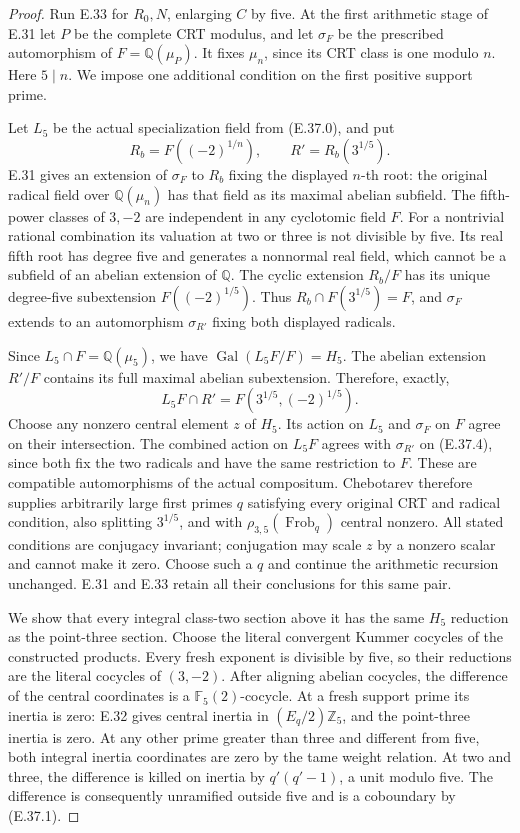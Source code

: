 \begin{proof}
Run E.33 for $R_0,N$, enlarging $C$ by five.  At the first arithmetic
stage of E.31 let $P$ be the complete CRT modulus, and let
$\sigma_F$ be the prescribed automorphism of
$F=\mathbb Q(\mu_P)$.  It fixes $\mu_n$, since its CRT class is
one modulo $n$.  Here $5\mid n$.  We impose one additional
condition on the first positive support prime.

Let $L_5$ be the actual specialization field from (E.37.0), and put
\[
 R_b=F((-2)^{1/n}),\qquad R'=R_b(3^{1/5}).
 \tag{E.37.3}
\]
E.31 gives an extension of $\sigma_F$ to $R_b$ fixing the displayed
$n$-th root: the original radical field over $\mathbb Q(\mu_n)$
has that field as its maximal abelian subfield.  The fifth-power
classes of $3,-2$ are independent in any cyclotomic field $F$.
For a nontrivial rational combination its valuation at two or
three is not divisible by five.  Its real fifth root has degree
five and generates a nonnormal real field, which cannot be a
subfield of an abelian extension of $\mathbb Q$.
The cyclic extension $R_b/F$ has its unique degree-five
subextension $F((-2)^{1/5})$.  Thus
$R_b\cap F(3^{1/5})=F$, and $\sigma_F$ extends to an
automorphism $\sigma_{R'}$ fixing both displayed radicals.

Since $L_5\cap F=\mathbb Q(\mu_5)$, we have
$\operatorname{Gal}(L_5F/F)=H_5$.  The abelian extension
$R'/F$ contains its full maximal abelian subextension.
Therefore, exactly,
\[
                 L_5F\cap R'=F(3^{1/5},(-2)^{1/5}).
 \tag{E.37.4}
\]
Choose any nonzero central element $z$ of $H_5$.  Its action on
$L_5$ and $\sigma_F$ on $F$ agree on their intersection.
The combined action on $L_5F$ agrees with $\sigma_{R'}$ on
(E.37.4), since both fix the two radicals and have the same
restriction to $F$.  These are compatible automorphisms of the
actual compositum.  Chebotarev therefore supplies arbitrarily
large first primes $q$ satisfying every original CRT and radical
condition, also splitting $3^{1/5}$, and with
$\rho_{3,5}(\operatorname{Frob}_q)$ central nonzero.
All stated conditions are conjugacy invariant; conjugation may
scale $z$ by a nonzero scalar and cannot make it zero.
Choose such a $q$ and continue the arithmetic recursion unchanged.
E.31 and E.33 retain all their conclusions for this same pair.

We show that every integral class-two section above it has the
same $H_5$ reduction as the point-three section.  Choose the
literal convergent Kummer cocycles of the constructed products.
Every fresh exponent is divisible by five, so their reductions
are the literal cocycles of $(3,-2)$.  After aligning abelian
cocycles, the difference of the central coordinates is a
$\mathbb F_5(2)$-cocycle.  At a fresh support prime its inertia
is zero: E.32 gives central inertia in $(E_q/2)\mathbb Z_5$,
and the point-three inertia is zero.  At any other prime greater
than three and different from five, both integral inertia
coordinates are zero by the tame weight relation.  At two and
three, the difference is killed on inertia by $q'(q'-1)$,
a unit modulo five.  The difference is consequently unramified
outside five and is a coboundary by (E.37.1).


\end{proof}
